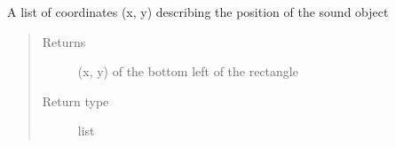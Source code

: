 \documentclass[letterpaper,10pt,english]{sphinxmanual}
\begin{document}
\begin{fulllineitems}
\begin{fulllineitems}
\label{\detokenize{source/pyzones:pyzones.SoundObject.position}}
A list of coordinates (x, y) describing the position of the sound object
\begin{quote}\begin{description}
\item[{Returns}] \leavevmode
(x, y) of the bottom left of the rectangle

\item[{Return type}] \leavevmode
list

\end{description}\end{quote}

\end{fulllineitems}


\end{fulllineitems}

\end{document}
